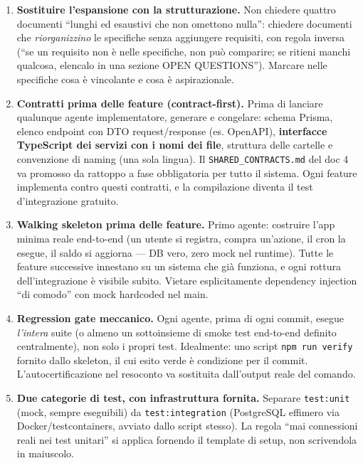 \documentclass[11pt,a4paper]{article}
\newcommand{\file}[1]{\texttt{\small #1}}
\begin{document}
\begin{enumerate}[leftmargin=1.8em]
  \item \textbf{Sostituire l'espansione con la strutturazione.} Non chiedere quattro documenti ``lunghi ed esaustivi che non omettono nulla'': chiedere documenti che \emph{riorganizzino} le specifiche senza aggiungere requisiti, con regola inversa (``se un requisito non \`e nelle specifiche, non pu\`o comparire; se ritieni manchi qualcosa, elencalo in una sezione OPEN QUESTIONS''). Marcare nelle specifiche cosa \`e vincolante e cosa \`e aspirazionale.

  \item \textbf{Contratti prima delle feature (contract-first).} Prima di lanciare qualunque agente implementatore, generare e congelare: schema Prisma, elenco endpoint con DTO request/response (es. OpenAPI), \textbf{interfacce TypeScript dei servizi con i nomi dei file}, struttura delle cartelle e convenzione di naming (una sola lingua). Il \file{SHARED\_CONTRACTS.md} del doc 4 va promosso da rattoppo a fase obbligatoria per tutto il sistema. Ogni feature implementa contro questi contratti, e la compilazione diventa il test d'integrazione gratuito.

  \item \textbf{Walking skeleton prima delle feature.} Primo agente: costruire l'app minima reale end-to-end (un utente si registra, compra un'azione, il cron la esegue, il saldo si aggiorna --- DB vero, zero mock nel runtime). Tutte le feature successive innestano su un sistema che gi\`a funziona, e ogni rottura dell'integrazione \`e visibile subito. Vietare esplicitamente dependency injection ``di comodo'' con mock hardcoded nel main.

  \item \textbf{Regression gate meccanico.} Ogni agente, prima di ogni commit, esegue \emph{l'intera} suite (o almeno un sottoinsieme di smoke test end-to-end definito centralmente), non solo i propri test. Idealmente: uno script \file{npm run verify} fornito dallo skeleton, il cui esito verde \`e condizione per il commit. L'autocertificazione nel resoconto va sostituita dall'output reale del comando.

  \item \textbf{Due categorie di test, con infrastruttura fornita.} Separare \file{test:unit} (mock, sempre eseguibili) da \file{test:integration} (PostgreSQL effimero via Docker/testcontainers, avviato dallo script stesso). La regola ``mai connessioni reali nei test unitari'' si applica fornendo il template di setup, non scrivendola in maiuscolo.


\end{enumerate}
\end{document}
